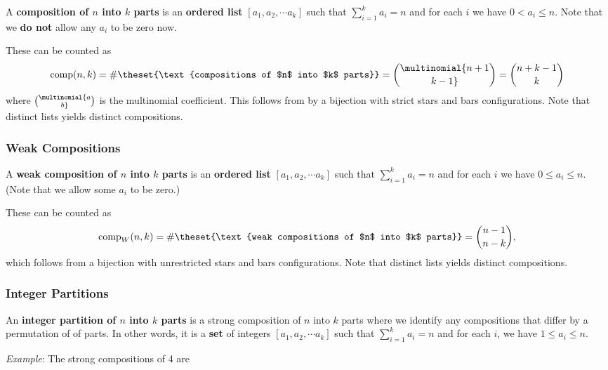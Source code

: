A \textbf{composition of \(n\) into \(k\) parts} is an \textbf{ordered
list} \([a_1, a_2, \cdots a_k]\) such that \(\sum_{i=1}^k a_i = n\) and
for each \(i\) we have \(0 < a_i \leq n\). Note that we \textbf{do not}
allow any \(a_i\) to be zero now.

These can be counted as
\begin{align*}
\mathrm{comp}(n, k) = \#\theset{\text{compositions of $n$ into $k$ parts}}
= \multinomial{n+1 \choose k-1}  = {n+k-1 \choose k}
\end{align*} where \(\multinomial{a \choose b}\) is the multinomial
coefficient. This follows from by a bijection with strict stars and bars
configurations. Note that distinct lists yields distinct compositions.

\hypertarget{weak-compositions}{%
\subsubsection{Weak Compositions}\label{weak-compositions}}

A \textbf{weak composition of \(n\) into \(k\) parts} is an
\textbf{ordered list} \([a_1, a_2, \cdots a_k]\) such that
\(\sum_{i=1}^k a_i = n\) and for each \(i\) we have
\(0 \leq a_i \leq n\). (Note that we allow some \(a_i\) to be zero.)

These can be counted as
\begin{align*}
\mathrm{comp}_W(n, k)  = \#\theset{\text{weak compositions of $n$ into $k$ parts}}
= {n-1 \choose n-k},
\end{align*} which follows from a bijection with unrestricted stars and
bars configurations. Note that distinct lists yields distinct
compositions.

\hypertarget{integer-partitions}{%
\subsubsection{Integer Partitions}\label{integer-partitions}}

An \textbf{integer partition of \(n\) into \(k\) parts} is a strong
composition of \(n\) into \(k\) parts where we identify any compositions
that differ by a permutation of of parts. In other words, it is a
\textbf{set} of integers \([a_1, a_2, \cdots a_k]\) such that
\(\sum_{i=1}^k a_i = n\) and for each \(i\), we have
\(1 \leq a_i \leq n\).

\emph{Example}: The strong compositions of 4 are

\begin{Shaded}
\begin{Highlighting}[]
  \OperatorTok{*}
\NormalTok{(}\NormalTok{(}\OperatorTok{=}\NormalTok{))}
\end{Highlighting}
\end{Shaded}

